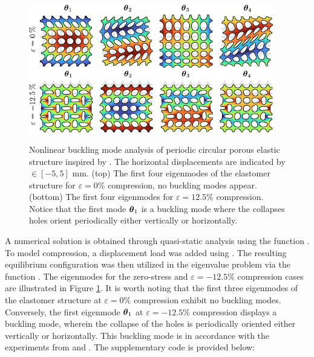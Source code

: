 \begin{example}
\begin{figure}[!t]
    \centering
\includegraphics*[width=0.95\textwidth]{./pdf/thesis-figure-6-6-1.pdf} \\[0.5em]
\includegraphics*[width=0.95\textwidth]{./pdf/thesis-figure-6-6-2.pdf}
%
\caption{\small Nonlinear buckling mode analysis of periodic circular porous elastic structure inspired by \cite{Bertoldi2008,Overvelde2012May}. The horizontal displacements are indicated by \protect{}$\!\!\in [-5,5]$ \si{\milli \meter}. (top) The first four eigenmodes of the elastomer structure for $\varepsilon = 0\%$ compression, no buckling modes appear. (bottom)  The first four eigenmodes for $\varepsilon = 12.5\%$ compression. Notice that the first mode ${\boldsymbol{\theta}}_1$ is a buckling mode where the collapses holes orient periodically either vertically or horizontally. }
\label{fig:C5:fig_bucklemode}
\vspace{-3mm}
\end{figure}

A numerical solution is obtained through quasi-static analysis using the function . To model compression, a displacement load was added using . The resulting equilibrium configuration was then utilized in the eigenvalue problem via the function . The eigenmodes for the zero-stress and $\varepsilon = -12.5\%$ compression cases are illustrated in Figure \ref{fig:C5:fig_bucklemode}. It is worth noting that the first three eigenmodes of the elastomer structure at $\varepsilon = 0\%$ compression exhibit no buckling modes. Conversely, the first eigenmode ${\boldsymbol{\theta}}_1$ at $\varepsilon = -12.5\%$ compression displays a buckling mode, wherein the collapse of the holes is periodically oriented either vertically or horizontally. This buckling mode is in accordance with the experiments from \cite{Overvelde2012May} and \cite{Bertoldi2008}. The supplementary code is provided below: 
\end{example}
%

